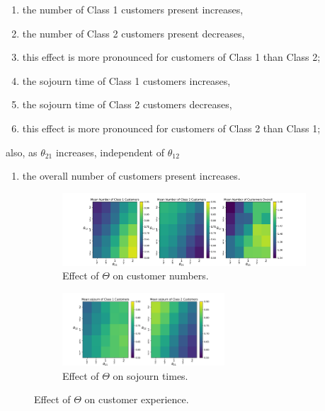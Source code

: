 \documentclass{article}
\begin{document}
{
\renewcommand{\theenumi}{E\arabic{enumi}}
\begin{enumerate}
  \item \label{enm:custs_1over2} the number of Class 1 customers present increases,
  \item \label{enm:custs_2over1} the number of Class 2 customers present decreases,
  \item \label{enm:custs_pronounced} this effect is more pronounced for customers of Class 1 than Class 2;
  \item \label{enm:sojourn_1over2} the sojourn time of Class 1 customers increases,
  \item \label{enm:sojourn_2over1} the sojourn time of Class 2 customers decreases,
  \item \label{enm:sojourn_pronounced} this effect is more pronounced for customers of Class 2 than Class 1;
\end{enumerate}


also, as $\theta_{21}$ increases, independent of $\theta_{12}$


\begin{enumerate}[resume]
  \item \label{enm:custs} the overall number of customers present increases.
\end{enumerate}
}

\begin{figure}[!htbp]
  \begin{subfigure}[b]{\textwidth}
    \begin{center}
    \includegraphics[width=\textwidth]{img/theta_effect_cust_numbers.pdf}
    \end{center}
    \caption{Effect of $\Theta$ on customer numbers.}
    \label{fig:theta_effect_custs}
  \end{subfigure}
  \begin{subfigure}[b]{\textwidth}
    \begin{center}
    \includegraphics[width=0.666\textwidth]{img/theta_effect_sojourn_times.pdf}
    \end{center}
    \caption{Effect of $\Theta$ on sojourn times.}
    \label{fig:theta_effect_sojourn}
  \end{subfigure}
  \caption{Effect of $\Theta$ on customer experience.}
  \label{fig:theta_effect}
\end{figure}
\end{document}
